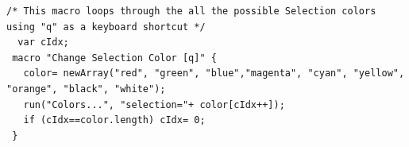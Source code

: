 
\begin{lstlisting}[caption={Using a Keyboard Shortcut to Change
Selection Color},label={lis:ChangeSelectionColor},showstringspaces=false,tabsize=4]
 /* This macro loops through the all the possible Selection colors using "q" as a keyboard shortcut */
  var cIdx;
 macro "Change Selection Color [q]" {
   color= newArray("red", "green", "blue","magenta", "cyan", "yellow", "orange", "black", "white");
   run("Colors...", "selection="+ color[cIdx++]);
   if (cIdx==color.length) cIdx= 0;
 } 
\end{lstlisting}



\subsubsection[\protect\userinterface{Appearance\ldots{}}]{\protect{}\label{sub:Appearance...}\improvement{}}

